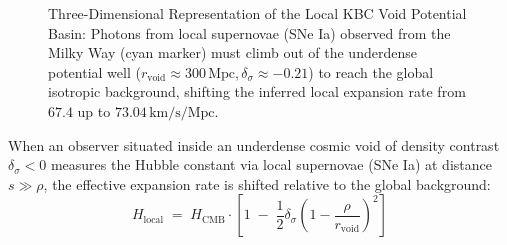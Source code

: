 \documentclass[
    12pt,
    a4paper,
    headings=normal,
    twoside=false,
    open=any,
    parskip=half
]{scrbook}
\begin{document}
\begin{figure}[htbp]
\caption{Three-Dimensional Representation of the Local KBC Void Potential Basin: Photons from local supernovae (SNe Ia) observed from the Milky Way (cyan marker) must climb out of the underdense potential well ($r_{\text{void}} \approx 300\,\text{Mpc}, \delta_\sigma \approx -0.21$) to reach the global isotropic background, shifting the inferred local expansion rate from $67.4$ up to $73.04\,\text{km/s/Mpc}$.}
\label{fig:ch11_kbc_void_3d}
\end{figure}

\begin{phystheorem}\label{thm:ch11_void_potential_hubble_correction}
When an observer situated inside an underdense cosmic void of density contrast $\delta_\sigma < 0$ measures the Hubble constant via local supernovae (SNe Ia) at distance $s \gg \rho$, the effective expansion rate is shifted relative to the global background:
\begin{equation}
\boxed{H_{\text{local}} \;=\; H_{\text{CMB}} \cdot \left[ 1 \;-\; \frac{1}{2} \delta_\sigma \left( 1 - \frac{\rho}{r_{\text{void}}} \right)^2 \right]}
\label{eq:ch11_void_hubble_master_formula}
\end{equation}
\end{phystheorem}
\end{document}
